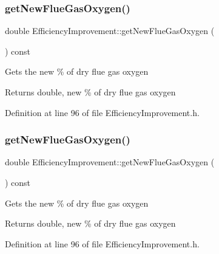 \subsubsection{\texorpdfstring{get\+New\+Flue\+Gas\+Oxygen()}{getNewFlueGasOxygen()}\hspace{0.1cm}{\footnotesize\ttfamily [1/3]}}
{\footnotesize\ttfamily double Efficiency\+Improvement\+::get\+New\+Flue\+Gas\+Oxygen (\begin{DoxyParamCaption}{ }\end{DoxyParamCaption}) const\hspace{0.3cm}{\ttfamily [inline]}}

Gets the new \% of dry flue gas oxygen

\begin{DoxyReturn}{Returns}
double, new \% of dry flue gas oxygen 
\end{DoxyReturn}


Definition at line 96 of file Efficiency\+Improvement.\+h.

\mbox{\label{class_efficiency_improvement_a46dbfa28b53f36de80dd730c07b294f1}} 
\subsubsection{\texorpdfstring{get\+New\+Flue\+Gas\+Oxygen()}{getNewFlueGasOxygen()}\hspace{0.1cm}{\footnotesize\ttfamily [2/3]}}
{\footnotesize\ttfamily double Efficiency\+Improvement\+::get\+New\+Flue\+Gas\+Oxygen (\begin{DoxyParamCaption}{ }\end{DoxyParamCaption}) const\hspace{0.3cm}{\ttfamily [inline]}}

Gets the new \% of dry flue gas oxygen

\begin{DoxyReturn}{Returns}
double, new \% of dry flue gas oxygen 
\end{DoxyReturn}


Definition at line 96 of file Efficiency\+Improvement.\+h.

\mbox{\label{class_efficiency_improvement_a46dbfa28b53f36de80dd730c07b294f1}} 
